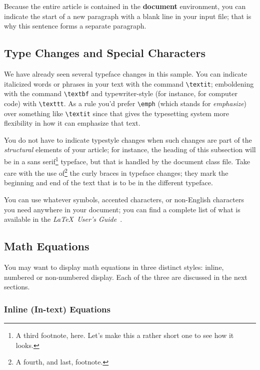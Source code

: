 \documentclass{sig-alternate}
\begin{document}
Because the entire article is contained in
the \textbf{document} environment, you can indicate the
start of a new paragraph with a blank line in your
input file; that is why this sentence forms a separate paragraph.

\subsection{Type Changes and {\subsecit Special} Characters}
\label{sec:typeChangesSpecialChars}

We have already seen several typeface changes in this sample.  You
can indicate italicized words or phrases in your text with
the command \texttt{\textbackslash textit}; emboldening with the
command \texttt{\textbackslash textbf}
and typewriter-style (for instance, for computer code) with
\texttt{\textbackslash texttt}.
As a rule you'd prefer \texttt{\textbackslash emph} (which stands for \emph{emphasize})
over something like \texttt{\textbackslash textit} since that gives the typesetting system
more flexibility in how it can emphasize that text.

You do not
have to indicate typestyle changes when such changes are
part of the \textit{structural} elements of your
article; for instance, the heading of this subsection will
be in a sans serif\footnote{A third footnote, here.
Let's make this a rather short one to
see how it looks.} typeface, but that is handled by the
document class file. Take care with the use
of\footnote{A fourth, and last, footnote.}
the curly braces in typeface changes; they mark
the beginning and end of
the text that is to be in the different typeface.

You can use whatever symbols, accented characters, or
non-English characters you need anywhere in your document;
you can find a complete list of what is
available in the \textit{\LaTeX\
User's Guide}~\cite{Lamport:LaTeX}.

\subsection{Math Equations}
\label{sec:mathEquations}

You may want to display math equations in three distinct styles:
inline, numbered or non-numbered display.  Each of
the three are discussed in the next sections.

\subsubsection{Inline (In-text) Equations}
\label{sec:inlineEquations}
\end{document}
